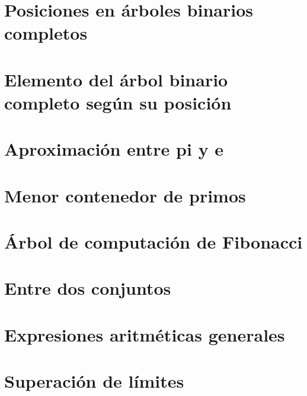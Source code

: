 \documentclass[a4paper,12pt,twoside]{book}
\begin{document}
\chapter{Posiciones en árboles binarios completos}
\label{051218}

\chapter{Elemento del árbol binario completo según su
  posición}
\label{061218}

\chapter{Aproximación entre pi y e}
\label{071218}


\chapter{Menor contenedor de primos}
\label{101218}

\chapter{Árbol de computación de Fibonacci}
\label{111218}

\chapter{Entre dos conjuntos}
\label{121218}

\chapter{Expresiones aritméticas generales}
\label{131218}

\chapter{Superación de límites}
\label{141218}

\end{document}
